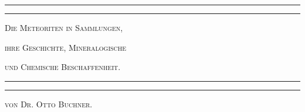 \documentclass[a4paper, 11pt, oneside]{article}
\begin{document}
\setlength{\parindent}{10pt}
\setlength{\parskip}{3pt}
\setlength{\cftsubsecnumwidth}{3em}
\setlength{\intextsep}{2pt plus 1.0pt minus 1.0pt}
\setlength{\textfloatsep}{2pt plus 1.0pt minus 1.0pt}
\setlength{\textfloatsep}{2pt plus 1.0pt minus 1.0pt}
\begin{titlepage} %
	\centering %

	
	\rule{\textwidth}{1.6pt}\vspace*{-\baselineskip}\vspace*{2pt} %
	\rule{\textwidth}{0.4pt} %
	
	\vspace{1.5\baselineskip} %
	
	{\scshape\LARGE Die Meteoriten in Sammlungen,}
	
	\vspace{1\baselineskip} %

	{\scshape\LARGE ihre Geschichte, Mineralogische}

	\vspace{1\baselineskip} %

	{\scshape\LARGE und Chemische Beschaffenheit.}

	\vspace{1.5\baselineskip} %

	\rule{\textwidth}{0.4pt}\vspace*{-\baselineskip}\vspace{3.2pt} %
	\rule{\textwidth}{1.6pt} %
	
	\vspace{1\baselineskip} %
	
	
	{\scshape von Dr. Otto Buchner.} %
	
	\vspace*{1\baselineskip} %
	
    

\end{titlepage}
\end{document}
